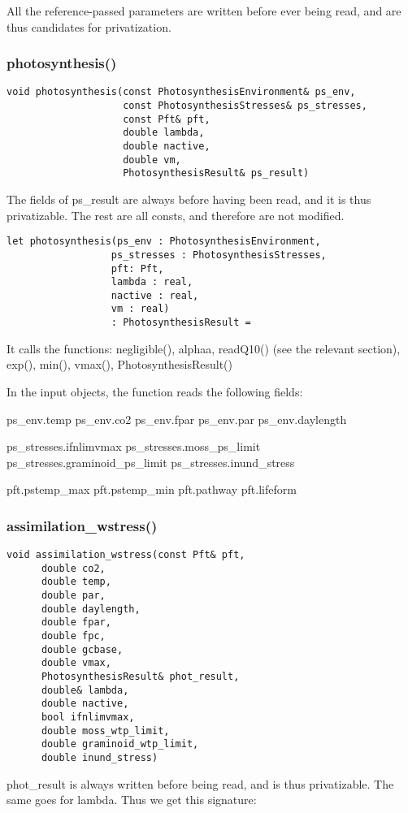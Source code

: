 All the reference-passed parameters are written before ever being read, and are thus candidates for privatization.

\subsubsection{photosynthesis()}
\begin{verbatim}
void photosynthesis(const PhotosynthesisEnvironment& ps_env,
                    const PhotosynthesisStresses& ps_stresses,
                    const Pft& pft,
                    double lambda,
                    double nactive,
                    double vm,
                    PhotosynthesisResult& ps_result)
\end{verbatim}
The fields of ps_result are always before having been read, and it is thus privatizable. The rest are all consts, and therefore are not modified.

\begin{verbatim}
let photosynthesis(ps_env : PhotosynthesisEnvironment,
                  ps_stresses : PhotosynthesisStresses,
                  pft: Pft,
                  lambda : real,
                  nactive : real,
                  vm : real)
                  : PhotosynthesisResult =
\end{verbatim}

It calls the functions: negligible(), alphaa, readQ10() (see the relevant section), exp(), min(), vmax(), PhotosynthesisResult()

In the input objects, the function reads the following fields:

ps_env.temp
ps_env.co2
ps_env.fpar
ps_env.par
ps_env.daylength

ps_stresses.ifnlimvmax
ps_stresses.moss_ps_limit
ps_stresses.graminoid_ps_limit
ps_stresses.inund_stress

pft.pstemp_max
pft.pstemp_min
pft.pathway
pft.lifeform


\subsubsection{assimilation_wstress()}
\begin{verbatim}
void assimilation_wstress(const Pft& pft,
      double co2,
      double temp,
      double par,
      double daylength,
      double fpar,
      double fpc,
      double gcbase,
      double vmax,
      PhotosynthesisResult& phot_result,
      double& lambda,
      double nactive,
      bool ifnlimvmax,
      double moss_wtp_limit,
      double graminoid_wtp_limit,
      double inund_stress)
\end{verbatim}
phot_result is always written before being read, and is thus privatizable. The same goes for lambda. Thus we get this signature:

